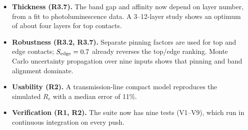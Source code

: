 \documentclass[11pt]{article}
\begin{document}
\begin{itemize}[nosep]
\item \textbf{Thickness (R3.7).} The band gap and affinity now depend on layer number, from a fit to photoluminescence data. A 3--12-layer study shows an optimum of about four layers for top contacts.
\item \textbf{Robustness (R3.2, R3.7).} Separate pinning factors are used for top and edge contacts; $S_{\rm edge}=0.7$ already reverses the top/edge ranking. Monte Carlo uncertainty propagation over nine inputs shows that pinning and band alignment dominate.
\item \textbf{Usability (R2).} A transmission-line compact model reproduces the simulated $R_c$ with a median error of 11\%.
\item \textbf{Verification (R1, R2).} The suite now has nine tests (V1--V9), which run in continuous integration on every push.
\end{itemize}
\end{document}

